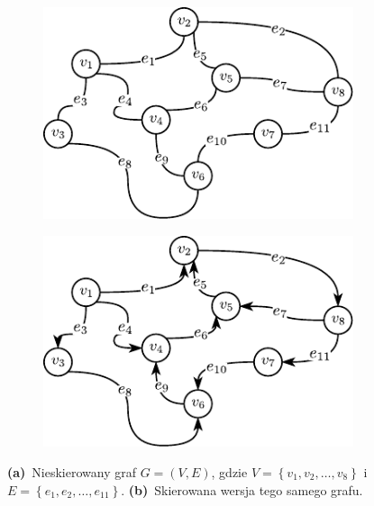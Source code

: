 \begin{figure}[!htbp]
	\null\hfill
	\begin{subfigure}[b]{0.32\textwidth}
		\includegraphics[width=\textwidth]{Chapter_I/DAG-UDAG-example/a}
		\caption{}
		\label{fig:dagudacExample:a}
	\end{subfigure}
	\hfill
	\begin{subfigure}[b]{0.32\textwidth}
		\includegraphics[width=\textwidth]{Chapter_I/DAG-UDAG-example/b}
		\caption{}
		\label{fig:dagudacExample:b}
	\end{subfigure}
	\hfill\null
	\caption{
		\textbf{(a)}~Nieskierowany graf $G = \left( V, E \right)$, gdzie $V = \left\{ v_{1}, v_{2}, \dots, v_{8} \right\}$ i $E = \left\{ e_{1}, e_{2}, \dots, e_{11} \right\}$.
		\textbf{(b)}~Skierowana wersja tego samego grafu.
	}
	\label{fig:dagudacExample}
\end{figure}

